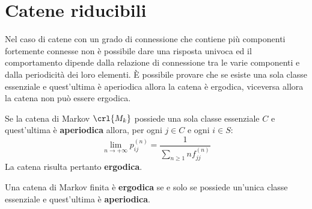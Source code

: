 \documentclass[\main/main.tex]{subfiles}
\begin{document}
\section{Catene riducibili}
Nel caso di catene con un grado di connessione che contiene più componenti fortemente connesse non è possibile dare una risposta univoca ed il comportamento dipende dalla relazione di connessione tra le varie componenti e dalla periodicità dei loro elementi. È possibile provare che se esiste una sola classe essenziale e quest'ultima è aperiodica allora la catena è ergodica, viceversa allora la catena non può essere ergodica.

\begin{theorem}
  Se la catena di Markov \(\crl{M_k}\) possiede una sola classe essenziale \(C\) e quest'ultima è \textbf{aperiodica} allora, per ogni \(j \in C\) e ogni \(i \in S\):
  \[
    \lim_{n\rightarrow+\infty} p^{(n)}_{ij} = \frac{1}{\sum_{n\geq 1} n f^{(n)}_{jj}}
  \]
  La catena risulta pertanto \textbf{ergodica}.
\end{theorem}

\begin{theorem}
  Una catena di Markov finita è \textbf{ergodica} se e solo se possiede un'unica classe essenziale e quest'ultima è \textbf{aperiodica}.
\end{theorem}
\end{document}
